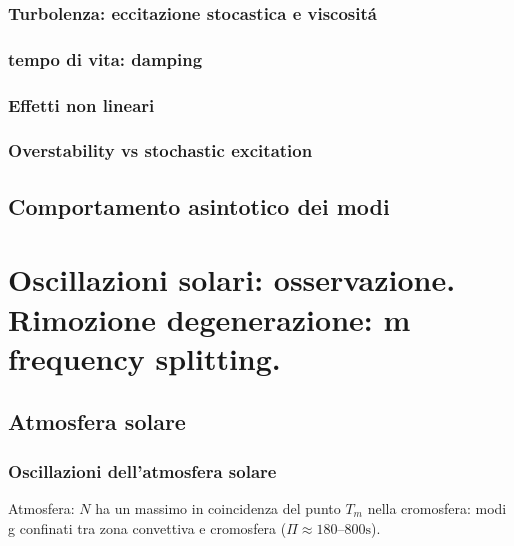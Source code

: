 \begin{refsection}
\subsection{Turbolenza: eccitazione stocastica e viscosit\'a}



\subsection{tempo di vita: damping}
\subsection{Effetti non lineari}
\subsection{Overstability vs stochastic excitation}

\section{Comportamento asintotico dei modi}

\end{refsection}


{\let\clearpage\relax
\chapter{Oscillazioni solari: osservazione. Rimozione degenerazione: m frequency splitting.}}
\PartialToc

\section{Atmosfera solare}

\begingroup
\nocite{*}
\let\clearpage\relax

\printbibliography[filter=atmosphere,keyword={rev},heading=bibsec,title={\textcolor{ochre}{Biblio about: ''Oscillazioni atmosfera.''}}]
\printbibliography[filter=atmosphere,notkeyword={rev},heading=bibsec,title={\textcolor{ochre}{Other refs about: ''Oscillazioni atmosfera.''}}]


\subsection{Oscillazioni dell'atmosfera solare}

\cite{}
Atmosfera: $N$ ha un massimo in coincidenza del punto $T_m$ nella cromosfera: modi g confinati tra zona convettiva e cromosfera ($\Pi\approx\numrange{180}{800}\si{\second}$).

